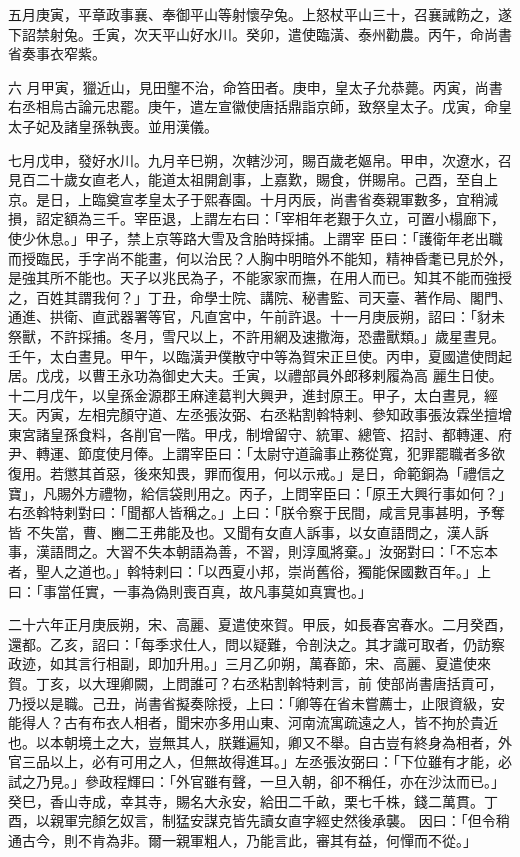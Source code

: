 \begin{pinyinscope}
 五月庚寅，平章政事襄、奉御平山等射懷孕兔。上怒杖平山三十，召襄誡飭之，遂下詔禁射兔。壬寅，次天平山好水川。癸卯，遣使臨潢、泰州勸農。丙午，命尚書省奏事衣窄紫。



 六
 月甲寅，獵近山，見田壟不治，命笞田者。庚申，皇太子允恭薨。丙寅，尚書右丞相烏古論元忠罷。庚午，遣左宣徽使唐括鼎詣京師，致祭皇太子。戊寅，命皇太子妃及諸皇孫執喪。並用漢儀。



 七月戊申，發好水川。九月辛巳朔，次轄沙河，賜百歲老嫗帛。甲申，次遼水，召見百二十歲女直老人，能道太祖開創事，上嘉歎，賜食，併賜帛。己酉，至自上京。是日，上臨奠宣孝皇太子于熙春園。十月丙辰，尚書省奏親軍數多，宜稍減損，詔定額為三千。宰臣退，上謂左右曰：「宰相年老艱于久立，可置小榻廊下，使少休息。」甲子，禁上京等路大雪及含胎時採捕。上謂宰
 臣曰：「護衛年老出職而授臨民，手字尚不能畫，何以治民？人胸中明暗外不能知，精神昏耄已見於外，是強其所不能也。天子以兆民為子，不能家家而撫，在用人而已。知其不能而強授之，百姓其謂我何？」丁丑，命學士院、講院、秘書監、司天臺、著作局、閣門、通進、拱衛、直武器署等官，凡直宮中，午前許退。十一月庚辰朔，詔曰：「豺未祭獸，不許採捕。冬月，雪尺以上，不許用網及速撒海，恐盡獸類。」歲星晝見。壬午，太白晝見。甲午，以臨潢尹僕散守中等為賀宋正旦使。丙申，夏國遣使問起居。戊戌，以曹王永功為御史大夫。壬寅，以禮部員外郎移剌履為高
 麗生日使。十二月戊午，以皇孫金源郡王麻達葛判大興尹，進封原王。甲子，太白晝見，經天。丙寅，左相完顏守道、左丞張汝弼、右丞粘割斡特剌、參知政事張汝霖坐擅增東宮諸皇孫食料，各削官一階。甲戌，制增留守、統軍、總管、招討、都轉運、府尹、轉運、節度使月俸。上謂宰臣曰：「太尉守道論事止務從寬，犯罪罷職者多欲復用。若懲其首惡，後來知畏，罪而復用，何以示戒。」是日，命範銅為「禮信之寶」，凡賜外方禮物，給信袋則用之。丙子，上問宰臣曰：「原王大興行事如何？」右丞斡特剌對曰：「聞都人皆稱之。」上曰：「朕令察于民間，咸言見事甚明，予奪皆
 不失當，曹、豳二王弗能及也。又聞有女直人訴事，以女直語問之，漢人訴事，漢語問之。大習不失本朝語為善，不習，則淳風將棄。」汝弼對曰：「不忘本者，聖人之道也。」斡特剌曰：「以西夏小邦，崇尚舊俗，獨能保國數百年。」上曰：「事當任實，一事為偽則喪百真，故凡事莫如真實也。」



 二十六年正月庚辰朔，宋、高麗、夏遣使來賀。甲辰，如長春宮春水。二月癸酉，還都。乙亥，詔曰：「每季求仕人，問以疑難，令剖決之。其才識可取者，仍訪察政迹，如其言行相副，即加升用。」三月乙卯朔，萬春節，宋、高麗、夏遣使來賀。丁亥，以大理卿闕，上問誰可？右丞粘割斡特剌言，前
 使部尚書唐括貢可，乃授以是職。己丑，尚書省擬奏除授，上曰：「卿等在省未嘗薦士，止限資級，安能得人？古有布衣人相者，聞宋亦多用山東、河南流寓疏遠之人，皆不拘於貴近也。以本朝境土之大，豈無其人，朕難遍知，卿又不舉。自古豈有終身為相者，外官三品以上，必有可用之人，但無故得進耳。」左丞張汝弼曰：「下位雖有才能，必試之乃見。」參政程輝曰：「外官雖有聲，一旦入朝，卻不稱任，亦在沙汰而已。」癸巳，香山寺成，幸其寺，賜名大永安，給田二千畝，栗七千株，錢二萬貫。丁酉，以親軍完顏乞奴言，制猛安謀克皆先讀女直字經史然後承襲。
 因曰：「但令稍通古今，則不肯為非。爾一親軍粗人，乃能言此，審其有益，何憚而不從。」




\end{pinyinscope}
